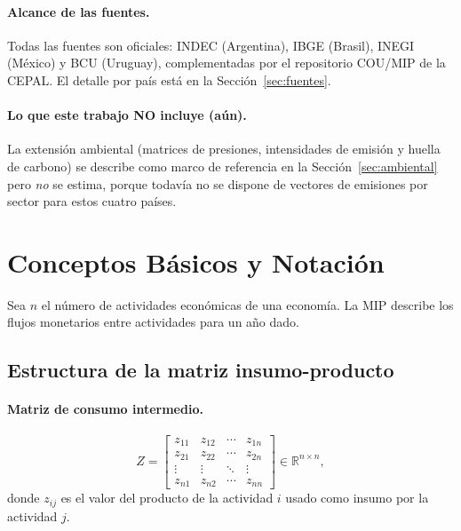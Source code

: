 \documentclass[11pt,a4paper]{article}
\newcommand{\R}{\mathbb{R}}
\begin{document}
\paragraph{Alcance de las fuentes.}
Todas las fuentes son oficiales: INDEC (Argentina), IBGE (Brasil), INEGI
(México) y BCU (Uruguay), complementadas por el repositorio COU/MIP de la CEPAL.
El detalle por país está en la Sección~\ref{sec:fuentes}.

\paragraph{Lo que este trabajo NO incluye (aún).}
La extensión ambiental (matrices de presiones, intensidades de emisión y huella
de carbono) se describe como marco de referencia en la
Sección~\ref{sec:ambiental} pero \emph{no} se estima, porque todavía no se
dispone de vectores de emisiones por sector para estos cuatro países.

\section{Conceptos Básicos y Notación}

Sea $n$ el número de actividades económicas de una economía. La MIP describe los
flujos monetarios entre actividades para un año dado.

\subsection{Estructura de la matriz insumo-producto}

\paragraph{Matriz de consumo intermedio.}
\begin{equation}
Z =
\begin{bmatrix}
z_{11} & z_{12} & \cdots & z_{1n}\\
z_{21} & z_{22} & \cdots & z_{2n}\\
\vdots & \vdots & \ddots & \vdots\\
z_{n1} & z_{n2} & \cdots & z_{nn}
\end{bmatrix}
\in \R^{n\times n},
\end{equation}
donde $z_{ij}$ es el valor del producto de la actividad $i$ usado como insumo por
la actividad $j$.
\end{document}
